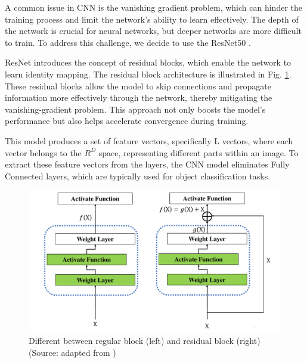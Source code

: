 \documentclass[conference]{IEEEtran}
\begin{document}
A common issue in CNN is the vanishing gradient problem, which can hinder the training process and limit the network's ability to learn effectively. The depth of the network is crucial for neural networks, but deeper networks are more difficult to train. To address this challenge, we decide to use the ResNet50 \cite{he2015deep}.


ResNet\cite{wang2017residual} introduces the concept of residual blocks, which enable the network to learn identity mapping. The residual block architecture is illustrated in Fig. \ref{fig:residual_block}. These residual blocks allow the model to skip connections and propagate information more effectively through the network, thereby mitigating the vanishing-gradient problem. This approach not only boosts the model's performance but also helps accelerate convergence during training.





This model produces a set of feature vectors, specifically L vectors, where each vector belongs to the $R^D$ space, representing different parts within an image. To extract these feature vectors from the layers, the CNN model eliminates Fully Connected layers, which are typically used for object classification tasks.


\begin{figure}[h]
    \centering
\includegraphics[width=\columnwidth]{assets/residual_block.pdf}
  \caption{Different between regular block (left) and residual block (right) (Source: adapted from \cite{jafar2021high})}
  \label{fig:residual_block}
\end{figure}
\end{document}
